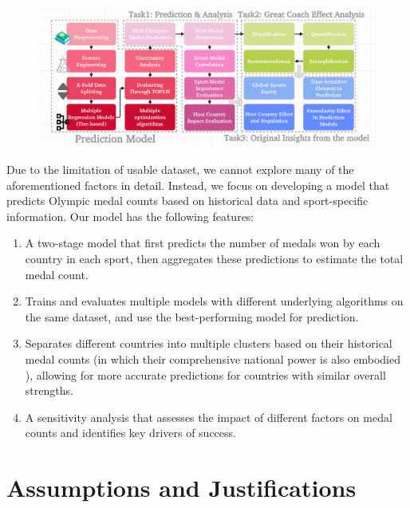 \documentclass{mcmthesis}
\begin{document}
\begin{figure}[htbp]
    \centering
    \includegraphics[width=1\textwidth]{pics/ourwork.png}
\end{figure}

Due to the limitation of usable dataset, we cannot explore many of the aforementioned factors in detail. Instead, we focus on developing a model that predicts Olympic medal counts based on historical data and sport-specific information. Our model has the following features:

\begin{enumerate}
    \item A two-stage model that first predicts the number of medals won by each country in each sport, then aggregates these predictions to estimate the total medal count.
    \item Trains and evaluates multiple models with different underlying algorithms on the same dataset, and use the best-performing model for prediction.
    \item Separates different countries into multiple clusters based on their historical medal counts (in which their comprehensive national power is also embodied \cite{7}), allowing for more accurate predictions for countries with similar overall strengths.
    \item A sensitivity analysis that assesses the impact of different factors on medal counts and identifies key drivers of success. 
\end{enumerate}

\section{Assumptions and Justifications} 
\end{document}
